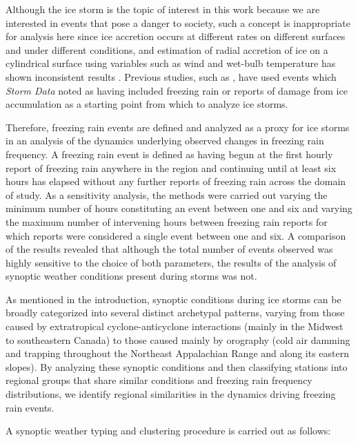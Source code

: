 \documentclass[twocol]{ametsoc}
\begin{document}
Although the ice storm is the topic of interest in this work because we are interested in events that pose a danger to society, such a concept is inappropriate for analysis here since ice accretion occurs at different rates on different surfaces and under different conditions, and estimation of radial accretion of ice on a cylindrical surface using variables such as wind and wet-bulb temperature has shown inconsistent results \citep{add a citation for this}. Previous studies, such as \citet{swaminathan2015modeling}, have used events which \textit{Storm Data} noted as having included freezing rain or reports of damage from ice accumulation as a starting point from which to analyze ice storms. 

Therefore, freezing rain events are defined and analyzed as a proxy for ice storms in an analysis of the dynamics underlying observed changes in freezing rain frequency. A freezing rain event is defined as having begun at the first hourly report of freezing rain anywhere in the region and continuing until at least six hours has elapsed without any further reports of freezing rain across the domain of study. As a sensitivity analysis, the methods were carried out varying the minimum number of hours constituting an event between one and six and varying the maximum number of intervening hours between freezing rain reports for which reports were considered a single event between one and six. A comparison of the results revealed that although the total number of events observed was highly sensitive to the choice of both parameters, the results of the analysis of synoptic weather conditions present during storms was not.

As mentioned in the introduction, synoptic conditions during ice storms can be broadly categorized into several distinct archetypal patterns, varying from those caused by extratropical cyclone-anticyclone interactions (mainly in the Midwest to southeastern Canada) to those caused mainly by orography (cold air damming and trapping throughout the Northeast Appalachian Range and along its eastern slopes). By analyzing these synoptic conditions and then classifying stations into regional groups that share similar conditions and freezing rain frequency distributions, we identify regional similarities in the dynamics driving freezing rain events.

A synoptic weather typing and clustering procedure is carried out as follows:
\end{document}
